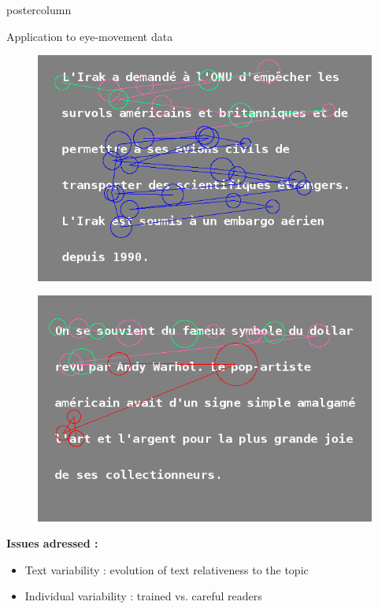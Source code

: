 \documentclass[final,hyperref={pdfpagelabels=false}]{beamer}
\begin{document}
\begin{frame}
\begin{columns}
\begin{column}{.50\textwidth}
\begin{beamercolorbox}[center,wd=\textwidth]{postercolumn}
\begin{minipage}[T]{.98\textwidth}
{\begin{block}{Application to eye-movement data}
\begin{minipage}{0.47\textwidth}
\begin{figure}[h]
                        \includegraphics[width=18cm]{scanpath-careful-reader-subj-8-text-14.png}
                    \end{figure}
                \end{minipage} \hfill
                \begin{minipage}{0.47\textwidth}
                    \begin{figure}[h]
                        \centering
                        \includegraphics[width=18cm]{scanpath-trained-reader-subj-13-text-5.png}
                    \end{figure}
                \end{minipage}
                \vskip 0.5cm
                \textbf{Issues adressed :}
                \begin{itemize}
                    \item[\bullet] Text variability : evolution of text relativeness to the topic
                    \item[\bullet] Individual variability : trained vs. careful readers
                \end{itemize}
            \end{block}

}
\end{minipage}
\end{beamercolorbox}
\end{column}
\end{columns}
\end{frame}
\end{document}
